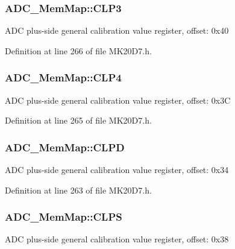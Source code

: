 \subsubsection[{\texorpdfstring{C\+L\+P3}{CLP3}}]{ A\+D\+C\+\_\+\+Mem\+Map\+::\+C\+L\+P3}\hypertarget{struct_a_d_c___mem_map_a6c77f6b67fa1eccf3549bcf27933f5e7}{}\label{struct_a_d_c___mem_map_a6c77f6b67fa1eccf3549bcf27933f5e7}
A\+DC plus-\/side general calibration value register, offset\+: 0x40 

Definition at line 266 of file M\+K20\+D7.\+h.

\subsubsection[{\texorpdfstring{C\+L\+P4}{CLP4}}]{ A\+D\+C\+\_\+\+Mem\+Map\+::\+C\+L\+P4}\hypertarget{struct_a_d_c___mem_map_ac5abb63ee92fd5bef99367385b258b20}{}\label{struct_a_d_c___mem_map_ac5abb63ee92fd5bef99367385b258b20}
A\+DC plus-\/side general calibration value register, offset\+: 0x3C 

Definition at line 265 of file M\+K20\+D7.\+h.

\subsubsection[{\texorpdfstring{C\+L\+PD}{CLPD}}]{ A\+D\+C\+\_\+\+Mem\+Map\+::\+C\+L\+PD}\hypertarget{struct_a_d_c___mem_map_a33d6e852c48cf68ba5b7db5f96e284f8}{}\label{struct_a_d_c___mem_map_a33d6e852c48cf68ba5b7db5f96e284f8}
A\+DC plus-\/side general calibration value register, offset\+: 0x34 

Definition at line 263 of file M\+K20\+D7.\+h.

\subsubsection[{\texorpdfstring{C\+L\+PS}{CLPS}}]{ A\+D\+C\+\_\+\+Mem\+Map\+::\+C\+L\+PS}\hypertarget{struct_a_d_c___mem_map_a6c8a55400c2b32d7018d37b23a6f3ec1}{}\label{struct_a_d_c___mem_map_a6c8a55400c2b32d7018d37b23a6f3ec1}
A\+DC plus-\/side general calibration value register, offset\+: 0x38 

